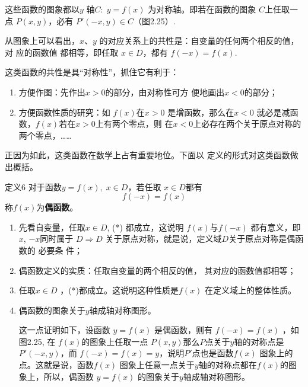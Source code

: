 这些函数的图象都以$y$
轴$C:\; y=f(x)$
为对称轴。即若在函数的图象
$C$上任取一点
$P(x,y)$，必有
$P'(-x,y)\in C$（图2.25）.

\begin{figure}[htp]
    \centering
{}
    \caption{}
\end{figure}



从图象上可以看出，$x$、$y$
的对应关系上的共性是：自变量的任何两个相反的值，对
应的函数值 都相等，即任取
$x\in D$，都有
$f(-x)=f(x)$.

这类函数的共性是具“对称性”，抓住它有利于：
\begin{enumerate}[(1)]
    \item 方便作图：先作出$x>0$的部分，由对称性可方
    便地画出$x<0$的部分；
    \item 方便函数性质的研究：如
    $f(x)$在$x>0$
    是增函数，那么在$x<0$
    就必是减函数，$f(x)$若在$x>0$上有两个零点，则
    在$x<0$上必存在两个关于原点对称的两个零点，……
\end{enumerate}

正因为如此，这类函数在数学上占有重要地位。下面以
    定义的形式对这类函数做出概括。


\begin{thm}{定义6}
  对于函数$y=f(x),\; x\in D$，若任取
$x\in D$都有
\begin{equation}
    f(-x)=f(x)\tag{*}
\end{equation}
称$f(x)$为\textbf{偶函数}。  
\end{thm}

\begin{note}
\begin{enumerate}
    \item 先看自变量，任取$x\in D$, (*)
都成立，这说明
$f(x)$与$f(-x)$
都有意义，即$x$, $-x$同时属于
$D\Longrightarrow D$
关于原点对称，就是说，定义域$D$关于原点对称是偶函数的 必要条
件；
\item 偶函数定义的实质：任取自变量的两个相反的值，
其对应的函数值都相等；
\item 任取$x\in D$
，(*)都成立。这说明这种性质是$f(x)$
在定义域上的整体性质。
\item 偶函数的图象关于$y$轴成轴对称图形。

这一点证明如下，设函数
$y=f(x)$
是偶函数，则有
$f(-x)=f(x)$
，如图2.25, 在
$f(x)$的图象上任取一点
$P(x,y)$那么$P$点关于$y$轴的对称点是
$P'(-x,y)$，而
$f(-x)=f(x)=y$，说明$P'$点也是函数$f(x)$
图象上的点。这就是说，函数$f(x)$
图象上任意一点关于$y$轴的对称点都在$f(x)$的图象上，所以，偶函数
$y=f(x)$
的图象关于$y$轴成轴对称图形。
\end{enumerate}
\end{note}

